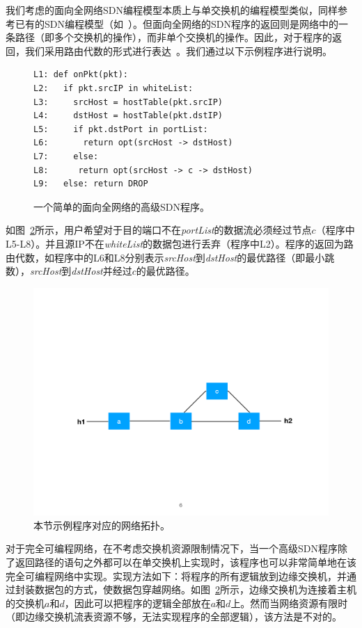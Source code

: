 我们考虑的面向全网络SDN编程模型本质上与单交换机的编程模型类似，同样参考已有的SDN编程模型（如~\cite{snap,sivaraman2016packet}）。但面向全网络的SDN程序的返回则是网络中的一条路径（即多个交换机的操作），而非单个交换机的操作。因此，对于程序的返回，我们采用路由代数的形式进行表达~\cite{gao2018t}。我们通过以下示例程序进行说明。

\begin{figure}[h]
\small{
\begin{verbatim}
L1: def onPkt(pkt):
L2:   if pkt.srcIP in whiteList:
L3:     srcHost = hostTable(pkt.srcIP)
L4:     dstHost = hostTable(pkt.dstIP)
L5:     if pkt.dstPort in portList:
L6:       return opt(srcHost -> dstHost)
L7:     else:
L8:      return opt(srcHost -> c -> dstHost)
L9:   else: return DROP
\end{verbatim}
}
    \caption{\small 一个简单的面向全网络的高级SDN程序。}
\label{fig:code1}
\end{figure}

如图~\ref{fig:topo1}所示，用户希望对于目的端口不在\emph{portList}的数据流必须经过节点$c$（程序中L5-L8）。并且源IP不在\emph{whiteList}的数据包进行丢弃（程序中L2）。程序的返回为路由代数，如程序中的L6和L8分别表示\emph{srcHost}到\emph{dstHost}的最优路径（即最小跳数），\emph{srcHost}到\emph{dstHost}并经过$c$的最优路径。

\begin{figure}[!htbp]
\includegraphics[width=0.8\linewidth]{figures/global-topo.pdf}
\centering
\caption{\small 本节示例程序对应的网络拓扑。}
\label{fig:topo1}
\end{figure}

对于完全可编程网络，在不考虑交换机资源限制情况下，当一个高级SDN程序除了返回路径的语句之外都可以在单交换机上实现时，该程序也可以非常简单地在该完全可编程网络中实现。实现方法如下：将程序的所有逻辑放到边缘交换机，并通过封装数据包的方式，使数据包穿越网络。如图~\ref{fig:topo1}所示，边缘交换机为连接着主机的交换机$a$和$d$，因此可以把程序的逻辑全部放在$a$和$d$上。然而当网络资源有限时（即边缘交换机流表资源不够，无法实现程序的全部逻辑），该方法是不对的。

